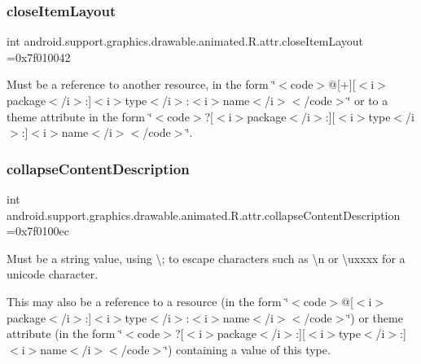 \subsubsection{\texorpdfstring{close\+Item\+Layout}{closeItemLayout}}
{\footnotesize\ttfamily int android.\+support.\+graphics.\+drawable.\+animated.\+R.\+attr.\+close\+Item\+Layout =0x7f010042\hspace{0.3cm}{\ttfamily [static]}}

Must be a reference to another resource, in the form \char`\"{}$<$code$>$@\mbox{[}+\mbox{]}\mbox{[}$<$i$>$package$<$/i$>$\+:\mbox{]}$<$i$>$type$<$/i$>$\+:$<$i$>$name$<$/i$>$$<$/code$>$\char`\"{} or to a theme attribute in the form \char`\"{}$<$code$>$?\mbox{[}$<$i$>$package$<$/i$>$\+:\mbox{]}\mbox{[}$<$i$>$type$<$/i$>$\+:\mbox{]}$<$i$>$name$<$/i$>$$<$/code$>$\char`\"{}. \mbox{\label{classandroid_1_1support_1_1graphics_1_1drawable_1_1animated_1_1R_1_1attr_a28e3f6c55f0becc3dc9bed828ec2de8c}} 
\subsubsection{\texorpdfstring{collapse\+Content\+Description}{collapseContentDescription}}
{\footnotesize\ttfamily int android.\+support.\+graphics.\+drawable.\+animated.\+R.\+attr.\+collapse\+Content\+Description =0x7f0100ec\hspace{0.3cm}{\ttfamily [static]}}

Must be a string value, using \textquotesingle{}\textbackslash{};\textquotesingle{} to escape characters such as \textquotesingle{}\textbackslash{}n\textquotesingle{} or \textquotesingle{}\textbackslash{}uxxxx\textquotesingle{} for a unicode character. 

This may also be a reference to a resource (in the form \char`\"{}$<$code$>$@\mbox{[}$<$i$>$package$<$/i$>$\+:\mbox{]}$<$i$>$type$<$/i$>$\+:$<$i$>$name$<$/i$>$$<$/code$>$\char`\"{}) or theme attribute (in the form \char`\"{}$<$code$>$?\mbox{[}$<$i$>$package$<$/i$>$\+:\mbox{]}\mbox{[}$<$i$>$type$<$/i$>$\+:\mbox{]}$<$i$>$name$<$/i$>$$<$/code$>$\char`\"{}) containing a value of this type. \mbox{\label{classandroid_1_1support_1_1graphics_1_1drawable_1_1animated_1_1R_1_1attr_aeb131496f92cb91ec384e07be37901ee}} 
